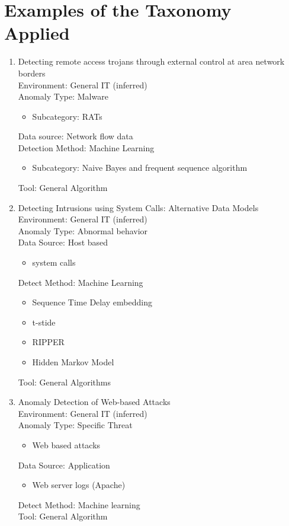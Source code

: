 

\section{Examples of the Taxonomy Applied}
\begin{enumerate}
    \item 
    Detecting remote access trojans through external control at area network borders\cite{wu2017detecting} \\
    Environment: General IT (inferred) \\
    Anomaly Type: Malware 
    \begin{itemize}
        \item Subcategory: RATs
    \end{itemize}  
    Data source: Network flow data\\ 
    Detection Method: Machine Learning
    \begin{itemize}
        \item Subcategory: Naive Bayes and frequent sequence algorithm
    \end{itemize} 
    Tool: General Algorithm
    
    \item 
    Detecting Intrusions using System Calls: Alternative Data Models\cite{warrender1999detecting}\\
    Environment: General IT (inferred)\\
    Anomaly Type: Abnormal behavior \\
    Data Source: Host based 
    \begin{itemize}
        \item system calls
    \end{itemize}
    Detect Method: Machine Learning
    \begin{itemize}
        \item Sequence Time Delay embedding
        \item t-stide
        \item RIPPER
        \item Hidden Markov Model
    \end{itemize} 
    Tool: General Algorithms
    
    \item  
    Anomaly Detection of Web-based Attacks\cite{kruegel2003anomaly}\\
    Environment: General IT (inferred) \\   
    Anomaly Type: Specific Threat 
    \begin{itemize}
        \item Web based attacks
    \end{itemize}
    Data Source: Application
    \begin{itemize}
        \item Web server logs (Apache)
    \end{itemize}
    Detect Method: Machine learning\\
    Tool: General Algorithm
    

\end{enumerate}
